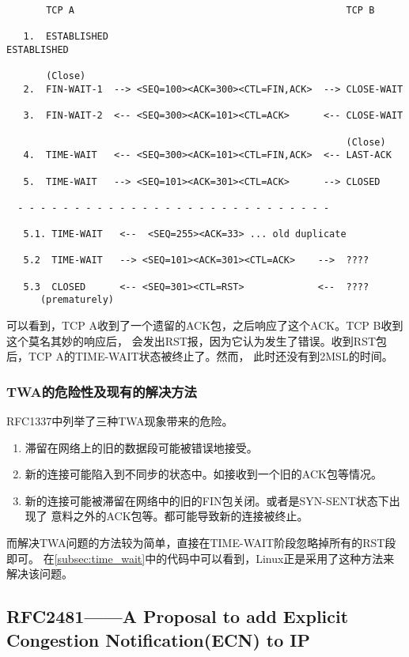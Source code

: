\begin{verbatim}
       TCP A                                                TCP B

   1.  ESTABLISHED                                          ESTABLISHED

       (Close)
   2.  FIN-WAIT-1  --> <SEQ=100><ACK=300><CTL=FIN,ACK>  --> CLOSE-WAIT

   3.  FIN-WAIT-2  <-- <SEQ=300><ACK=101><CTL=ACK>      <-- CLOSE-WAIT

                                                            (Close)
   4.  TIME-WAIT   <-- <SEQ=300><ACK=101><CTL=FIN,ACK>  <-- LAST-ACK

   5.  TIME-WAIT   --> <SEQ=101><ACK=301><CTL=ACK>      --> CLOSED

  - - - - - - - - - - - - - - - - - - - - - - - - - - - -

   5.1. TIME-WAIT   <--  <SEQ=255><ACK=33> ... old duplicate

   5.2  TIME-WAIT   --> <SEQ=101><ACK=301><CTL=ACK>    -->  ????

   5.3  CLOSED      <-- <SEQ=301><CTL=RST>             <--  ????
      (prematurely)
\end{verbatim}
可以看到，TCP A收到了一个遗留的ACK包，之后响应了这个ACK。TCP B收到这个莫名其妙的响应后，
会发出RST报，因为它认为发生了错误。收到RST包后，TCP A的TIME-WAIT状态被终止了。然而，
此时还没有到2MSL的时间。

\subsubsection{TWA的危险性及现有的解决方法}
RFC1337中列举了三种TWA现象带来的危险。

\begin{enumerate}
\item 滞留在网络上的旧的数据段可能被错误地接受。
\item 新的连接可能陷入到不同步的状态中。如接收到一个旧的ACK包等情况。
\item 新的连接可能被滞留在网络中的旧的FIN包关闭。或者是SYN-SENT状态下出现了
意料之外的ACK包等。都可能导致新的连接被终止。
\end{enumerate}

而解决TWA问题的方法较为简单，直接在TIME-WAIT阶段忽略掉所有的RST段即可。
在\ref{subsec:time_wait}中的代码中可以看到，Linux正是采用了这种方法来解决该问题。
	\subsection{RFC2481——A Proposal to add Explicit Congestion Notification(ECN) to IP}
	\label{subsec:rfc2481}

